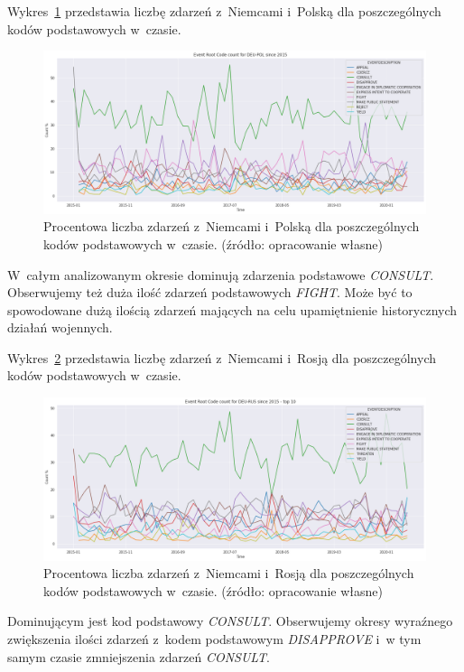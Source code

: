 \documentclass[11pt]{report}
\begin{document}
    Wykres~\ref{fig:DEUPOLERC} przedstawia liczbę zdarzeń z~Niemcami i~Polską dla poszczególnych kodów podstawowych w~czasie.
    \begin{figure}[!htp]
        \centering
        \includegraphics[width=\linewidth]{fig/DEU/DEUPOLERCperc.png}
        \caption{Procentowa liczba zdarzeń z~Niemcami i~Polską dla poszczególnych kodów podstawowych w~czasie. (źródło: opracowanie własne)}
        \label{fig:DEUPOLERC}
    \end{figure}
    W~całym analizowanym okresie dominują zdarzenia podstawowe \textit{CONSULT}.
    Obserwujemy też duża ilość zdarzeń podstawowych \textit{FIGHT}.
    Może być to spowodowane dużą ilością zdarzeń mających na celu upamiętnienie historycznych działań wojennych.

    Wykres~\ref{fig:DEURUSERC} przedstawia liczbę zdarzeń z~Niemcami i~Rosją dla poszczególnych kodów podstawowych w~czasie.
    \begin{figure}[!htp]
        \centering
        \includegraphics[width=\linewidth]{fig/DEU/DEURUSERCperc.png}
        \caption{Procentowa liczba zdarzeń z~Niemcami i~Rosją dla poszczególnych kodów podstawowych w~czasie. (źródło: opracowanie własne)}
        \label{fig:DEURUSERC}
    \end{figure}
    Dominującym jest kod podstawowy \textit{CONSULT}.
    Obserwujemy okresy wyraźnego zwiększenia ilości zdarzeń z~kodem podstawowym \textit{DISAPPROVE} i~w tym samym czasie zmniejszenia zdarzeń \textit{CONSULT}.
\end{document}
